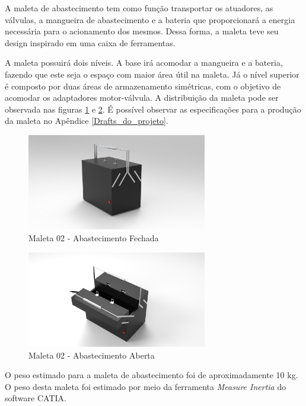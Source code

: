 \par A maleta de abastecimento tem como função transportar os atuadores, as válvulas, a mangueira de abastecimento e a bateria que proporcionará a energia necessária para o acionamento dos mesmos. Dessa forma, a maleta teve seu design inspirado em uma caixa de ferramentas. 

\par A maleta possuirá dois níveis. A base irá acomodar a mangueira e a bateria, fazendo que este seja o espaço com maior área útil na maleta. Já o nível superior é composto por duas áreas de armazenamento simétricas, com o objetivo de acomodar os adaptadores motor-válvula. A distribuição da maleta pode ser observada nas figuras \ref{fig:Render Maleta Alimentacao01} e \ref{fig:Render Maleta Alimentacao02}. É possível observar as especificações para a produção da maleta no Apêndice \ref{Drafts_do_projeto}.

\begin{figure}[H]
\centering
\includegraphics[width=0.7\textwidth]{figuras/cad/untitled.4.jpg}
\caption{Maleta 02 - Abastecimento Fechada}
\label{fig:Render Maleta Alimentacao01}
\end{figure}

\begin{figure}[H]
\centering
\includegraphics[width=0.7\textwidth]{figuras/cad/untitled.5.jpg}
\caption{Maleta 02 - Abastecimento Aberta}
\label{fig:Render Maleta Alimentacao02}
\end{figure}

\par O peso estimado para a maleta de abastecimento foi de aproximadamente 10 kg. O peso desta maleta foi estimado por meio da ferramenta \textit{Measure Inertia} do software CATIA.

